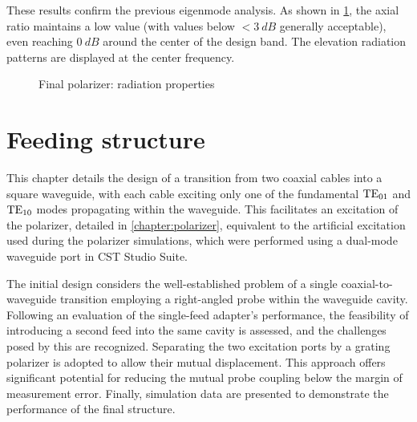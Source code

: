 \documentclass[14pt,a4paper]{ntust_report}
\begin{document}
These results confirm the previous eigenmode analysis. As shown in \cref{fig:polarizer-radiation}, the axial ratio maintains a low value (with values below $<\qty{3}{dB}$ generally acceptable), even reaching $\qty{0}{dB}$ around the center of the design band. The elevation radiation patterns are displayed at the center frequency.

\begin{figure}[!ht]
    \centering
    
    \caption{\label{fig:polarizer-radiation}Final polarizer: radiation properties}
\end{figure}

\chapter{Feeding structure}
\label{chapter:feeding-structure}
This chapter details the design of a transition from two coaxial cables into a square waveguide, with each cable exciting only one of the fundamental $\text{TE}_{01}$ and $\text{TE}_{10}$ modes propagating within the waveguide. This facilitates an excitation of the polarizer, detailed in \cref{chapter:polarizer}, equivalent to the artificial excitation used during the polarizer simulations, which were performed using a dual-mode waveguide port in CST Studio Suite.

The initial design considers the well-established problem of a single coaxial-to-waveguide transition employing a right-angled probe within the waveguide cavity. Following an evaluation of the single-feed adapter's performance, the feasibility of introducing a second feed into the same cavity is assessed, and the challenges posed by this are recognized. Separating the two excitation ports by a grating polarizer is adopted to allow their mutual displacement. This approach offers significant potential for reducing the mutual probe coupling below the margin of measurement error. Finally, simulation data are presented to demonstrate the performance of the final structure.
\end{document}

